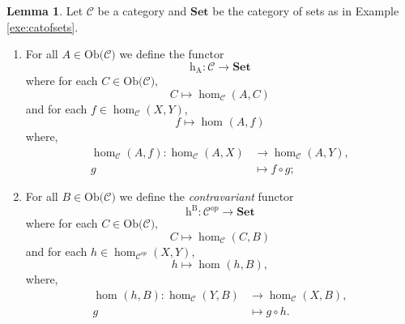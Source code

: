 \documentclass[11pt,a4paper]{article}
\theoremstyle{definition}
\newtheorem{lemma}[thm]{Lemma}
\newcommand\ho[3][]{\hom_{#1}(#2,#3)}
\newcommand\ob[1]{\mathrm{Ob(}#1\mathrm{)}}
\newcommand\cat[1]{\mathscr{#1}}
\newcommand\func[3]{\mathrm{#1}\colon#2\rightarrow#3}
\numberwithin{equation}{section}
\begin{document}
\begin{lemma}
    \label{lem:homsetfunctor}
    Let $\cat{C}$ be a category and $\mathbf{Set}$ be the category of sets as in Example \ref{exe:catofsets}. 
    \begin{enumerate}
    \item For all $A\in\ob{\cat{C}}$ we define the functor
    \[\func{h_{A}}{\cat{C}}{\mathbf{Set}}\] 
    where for each $C\in\ob{\cat{C}},$
    \[C \mapsto \ho[\cat{C}]{A}{C}\]
    and for each $f\in\ho[\cat{C}]{X}{Y}$,
    \[f\mapsto \ho{A}{f}\]
    where,
    \begin{align*}
        \ho[\cat{C}]{A}{f}\colon\ho[\cat{C}]{A}{X}&\to\ho[\cat{C}]{A}{Y},\\
        g&\mapsto f\circ g;
    \end{align*}
    \item For all $B\in\ob{\cat{C}}$ we define the \emph{contravariant} functor
    \[\func{h^{B}}{\cat{C}^{op}}{\mathbf{Set}}\] 
    where for each $C\in\ob{\cat{C}},$
    \[C \mapsto \ho[\cat{C}]{C}{B}\]
    and for each $h\in\ho[\cat{C}^{op}]{X}{Y}$,
    \[h\mapsto \ho{h}{B},\]
    where,
    \begin{align*}
        \ho{h}{B}\colon\ho[\cat{C}]{Y}{B}&\to\ho[\cat{C}]{X}{B},\\
        g&\mapsto g\circ h.
    \end{align*}
    \end{enumerate}
\end{lemma}
\end{document}
